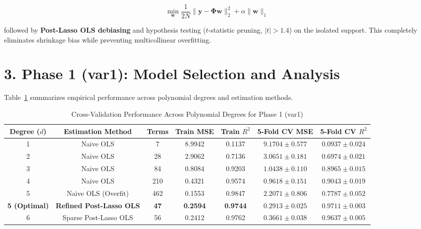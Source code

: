 \documentclass[11pt,a4paper]{article}
\begin{document}
\begin{eqbox}
\begin{equation}
\min_{\mathbf{w}} \frac{1}{2N} \|\mathbf{y} - \boldsymbol{\Phi} \mathbf{w}\|_2^2 + \alpha \|\mathbf{w}\|_1
\end{equation}
\end{eqbox}

\noindent followed by \textbf{Post-Lasso OLS debiasing} and hypothesis testing ($t$-statistic pruning, $|t| > 1.4$) on the isolated support. This completely eliminates shrinkage bias while preventing multicollinear overfitting.

\section{\color{primary} 3. Phase 1 (var1): Model Selection and Analysis}

Table~\ref{tab:var1_results} summarizes empirical performance across polynomial degrees and estimation methods.

\begin{table}[h]
\centering
\small
\caption{Cross-Validation Performance Across Polynomial Degrees for Phase 1 (var1)}
\label{tab:var1_results}
\begin{tabular}{ccccccc}
\toprule
\rowcolor{primary} \color{white}\textbf{Degree ($d$)} & \color{white}\textbf{Estimation Method} & \color{white}\textbf{Terms} & \color{white}\textbf{Train MSE} & \color{white}\textbf{Train $R^2$} & \color{white}\textbf{5-Fold CV MSE} & \color{white}\textbf{5-Fold CV $R^2$} \\
\midrule
1 & Naive OLS & 7 & 8.9942 & 0.1137 & $9.1704 \pm 0.577$ & $0.0937 \pm 0.024$ \\
2 & Naive OLS & 28 & 2.9062 & 0.7136 & $3.0651 \pm 0.181$ & $0.6974 \pm 0.021$ \\
3 & Naive OLS & 84 & 0.8084 & 0.9203 & $1.0438 \pm 0.110$ & $0.8965 \pm 0.015$ \\
4 & Naive OLS & 210 & 0.4321 & 0.9574 & $0.9618 \pm 0.151$ & $0.9043 \pm 0.019$ \\
5 & Naive OLS (Overfit) & 462 & 0.1553 & 0.9847 & $2.2071 \pm 0.806$ & $0.7787 \pm 0.052$ \\
\rowcolor{highlightgold} \textbf{5 (Optimal)} & \textbf{Refined Post-Lasso OLS} & \textbf{47} & \textbf{0.2594} & \textbf{0.9744} & $\mathbf{0.2913 \pm 0.025}$ & $\mathbf{0.9711 \pm 0.003}$ \\
6 & Sparse Post-Lasso OLS & 56 & 0.2412 & 0.9762 & $0.3661 \pm 0.038$ & $0.9637 \pm 0.005$ \\
\bottomrule
\end{tabular}
\end{table}
\end{document}
